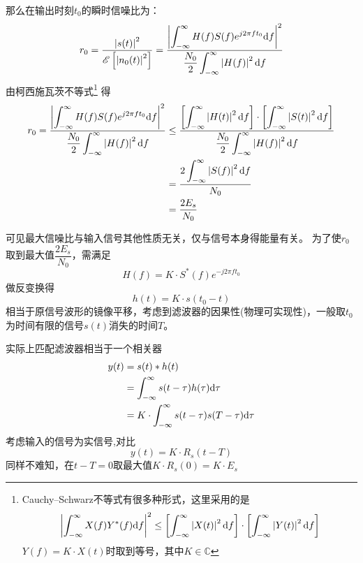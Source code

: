     那么在输出时刻$t_0$的瞬时信噪比为：
    \begin{equation}
        r_0=\frac{\left\vert s(t) \right\vert^2}{\mathscr{E}\left[\left\vert n_0(t) \right\vert^2\right]}=\frac{\left\vert \displaystyle\int_{-\infty}^{\infty}H(f)S(f)e^{j2\pi ft_0}\text{\upshape d} f \right\vert^2}{\dfrac{N_0}{2}\displaystyle\int_{-\infty}^{\infty}\left\vert H(f) \right\vert^2\text{\upshape d} f}
    \end{equation}
    由柯西施瓦茨不等式\footnote{Cauchy--Schwarz不等式有很多种形式，这里采用的是\begin{equation*}
        \left\vert \int_{-\infty}^{\infty}X(f)Y^*(f)\text{\upshape d} f \right\vert^2\leq \left[\int_{-\infty}^{\infty}\left\vert X(t) \right\vert^2\text{\upshape d} f\right]\cdot\left[\int_{-\infty}^{\infty}\left\vert Y(t) \right\vert^2\text{\upshape d} f\right]
    \end{equation*}
    $Y(f)=K\cdot X(t)$时取到等号，其中$K\in\mathbb{C}$}
    得
    \begin{equation}
        \begin{split}
            r_0=\frac{\left\vert \displaystyle\int_{-\infty}^{\infty}H(f)S(f)e^{j2\pi ft_0}\text{\upshape d} f \right\vert^2}{\dfrac{N_0}{2}\displaystyle\int_{-\infty}^{\infty}\left\vert H(f) \right\vert^2\text{\upshape d} f}&\leq\frac{\left[\displaystyle\int_{-\infty}^{\infty}\left\vert H(t) \right\vert^2\text{\upshape d} f\right]\cdot\left[\displaystyle\int_{-\infty}^{\infty}\left\vert S(t) \right\vert^2\text{\upshape d} f\right]}{\dfrac{N_0}{2}\displaystyle\int_{-\infty}^{\infty}\left\vert H(f) \right\vert^2\text{\upshape d} f}\\
            &=\frac{2\displaystyle\int_{-\infty}^{\infty}\left\vert S(f) \right\vert^2\text{\upshape d} f}{N_0}\\
            &=\frac{2E_s}{N_0}
        \end{split}
    \end{equation}

    可见最大信噪比与输入信号其他性质无关，仅与信号本身得能量有关。
    为了使$r_0$取到最大值$\dfrac{2E_s}{N_0}$，需满足
    \begin{equation}
        H(f)=K\cdot S^*(f)e^{-j2\pi ft_0}
    \end{equation}
    做反变换得
    \begin{equation}
        h(t)=K\cdot s(t_0-t)
    \end{equation}
    相当于原信号波形的镜像平移，考虑到滤波器的因果性(物理可实现性)，一般取$t_0$为时间有限的信号$s(t)$消失的时间$T$。
    
    实际上匹配滤波器相当于一个相关器
    \begin{equation}
        \begin{split}
            y(t)&=s(t)*h(t)\\
                &=\int_{-\infty}^{\infty}s(t-\tau)h(\tau)\text{\upshape d} \tau\\
                &=K\cdot\int_{-\infty}^{\infty}s(t-\tau)s(T-\tau)\text{\upshape d} \tau
        \end{split}
    \end{equation}
    考虑输入的信号为实信号,对比
    \begin{equation}
        y(t)=K\cdot R_s(t-T)
    \end{equation}
    同样不难知，在$t-T=0$取最大值$K\cdot R_s(0)=K\cdot E_s$


    

